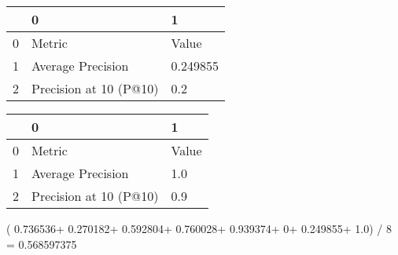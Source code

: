 \begin{tabular}{lll}
\toprule
{} &                       0 &         1 \\
\midrule
0 &                  Metric &     Value \\
1 &       Average Precision &  0.249855 \\
2 &  Precision at 10 (P@10) &       0.2 \\
\bottomrule
\end{tabular}

\begin{tabular}{lll}
\toprule
{} &                       0 &      1 \\
\midrule
0 &                  Metric &  Value \\
1 &       Average Precision &    1.0 \\
2 &  Precision at 10 (P@10) &    0.9 \\
\bottomrule
\end{tabular}

(  0.736536+
0.270182+
0.592804+
0.760028+
0.939374+
    0+
0.249855+
  1.0) / 8 = 0.568597375